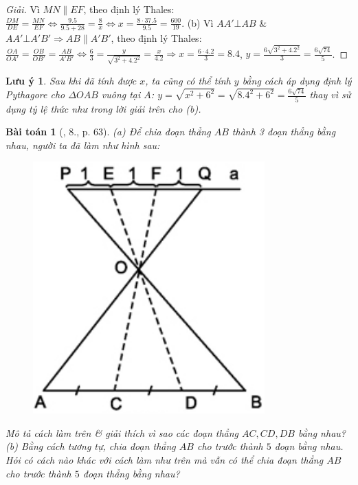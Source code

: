 \documentclass{article}
\newtheorem{baitoan}{Bài toán}
\newtheorem{luuy}{Lưu ý}
\begin{document}
\begin{proof}[Giải]
	Vì $MN\parallel EF$, theo định lý Thales: $\frac{DM}{DE} = \frac{MN}{EF}\Leftrightarrow\frac{9.5}{9.5 + 28} = \frac{8}{x}\Leftrightarrow x = \frac{8\cdot37.5}{9.5} = \frac{600}{19}$. (b) Vì $AA'\bot AB$ \& $AA'\bot A'B'\Rightarrow AB\parallel A'B'$, theo định lý Thales: $\frac{OA}{OA'} = \frac{OB}{OB'} = \frac{AB}{A'B'}\Leftrightarrow\frac{6}{3} = \frac{y}{\sqrt{3^2 + 4.2^2}} = \frac{x}{4.2}\Rightarrow x = \frac{6\cdot4.2}{3} = 8.4$, $y = \frac{6\sqrt{3^2 + 4.2^2}}{3} = \frac{6\sqrt{74}}{5}$.
\end{proof}

\begin{luuy}
	Sau khi đã tính được $x$, ta cũng có thể tính $y$ bằng cách áp dụng định lý Pythagore cho $\Delta OAB$ vuông tại $A$: $y = \sqrt{x^2 + 6^2} = \sqrt{8.4^2 + 6^2} = \frac{6\sqrt{74}}{5}$ thay vì sử dụng tỷ lệ thức như trong lời giải trên cho (b).
\end{luuy}

\begin{baitoan}[\cite{SGK_Toan_8_tap_2}, 8., p. 63]
	(a) Để chia đoạn thẳng $AB$ thành 3 đoạn thẳng bằng nhau, người ta đã làm như hình sau:
	\begin{figure}[H]
		\centering
		\includegraphics[scale=.25]{SGK_Toan_8_15}
	\end{figure}
	\noindent Mô tả cách làm trên \& giải thích vì sao các đoạn thẳng $AC,CD,DB$ bằng nhau? (b) Bằng cách tương tự, chia đoạn thẳng $AB$ cho trước thành $5$ đoạn bằng nhau. Hỏi có cách nào khác với cách làm như trên mà vẫn có thể chia đoạn thẳng $AB$ cho trước thành $5$ đoạn thẳng bằng nhau?
\end{baitoan}
\end{document}
